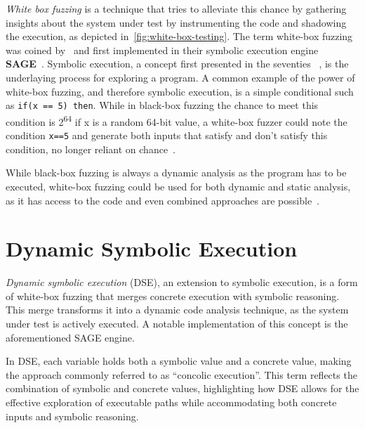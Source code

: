 \textit{White box fuzzing} is a technique that tries to alleviate this chance by gathering insights about the system under test by instrumenting the code and shadowing the execution, as depicted in~\autoref{fig:white-box-testing}.
The term white-box fuzzing was coined by~\citet{godefroid_automated_2008} and first implemented in their symbolic execution engine \textbf{SAGE}~\cite{godefroid_sage_2012}. Symbolic execution, a concept first presented in the seventies ~\cite{boyer_selectformal_1975,king_new_1975,king_symbolic_1976}, is the underlaying process for exploring a program.
A common example of the power of white-box fuzzing, and therefore symbolic execution,  is a simple conditional such as \lstinline+if(x == 5) then+. While in black-box fuzzing the chance to meet this condition is 2\textsuperscript{64} if x is a random 64-bit value, a white-box fuzzer could note the condition \lstinline+x==5+ and generate both inputs that satisfy and don't satisfy this condition, no longer reliant on chance~\cite{godefroid_automated_2008}.

While black-box fuzzing is always a dynamic analysis as the program has to be executed, white-box fuzzing could be used for both dynamic and static analysis, as it has access to the code and even combined approaches are possible~\cite{artho_combined_2005}.



\section{Dynamic Symbolic Execution}
\label{sec:dse}
\textit{Dynamic symbolic execution} (DSE), an extension to symbolic execution, is a form of white-box fuzzing that merges concrete execution with symbolic reasoning. This merge transforms it into a dynamic code analysis technique, as the system under test is actively executed. A notable implementation of this concept is the aforementioned SAGE engine.

In DSE, each variable holds both a symbolic value and a concrete value, making the approach commonly referred to as “concolic execution”. This term reflects the combination of symbolic and concrete values, highlighting how DSE allows for the effective exploration of executable paths while accommodating both concrete inputs and symbolic reasoning. 

